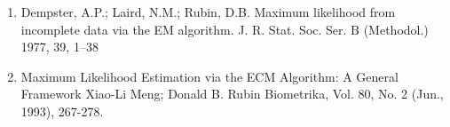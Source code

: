 \documentclass[11pt]{article}
\begin{document}
\begin{center}
\fontsize{14}{18}\selectfont {}
\end{center}
\begin{center}
\fontsize{14}{18}\selectfont {}
\end{center}
\clearpage
\begin{center}
\fontsize{16}{20}\selectfont {}
\end{center}
\begin{enumerate}
\item
Dempster, A.P.; Laird, N.M.; Rubin, D.B. Maximum likelihood from incomplete data via the EM algorithm. J. R. Stat. Soc. Ser. B
(Methodol.) 1977, 39, 1–38
\item
Maximum Likelihood Estimation via the ECM Algorithm: A General Framework Xiao-Li Meng; Donald B. Rubin Biometrika, Vol. 80, No. 2 (Jun., 1993), 267-278.
\end{enumerate}
\end{document}
